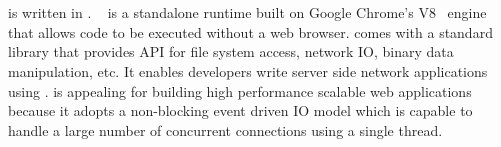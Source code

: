 








\section{\nodejs}

\cb is written in \nodejs. \nodejs~\cite{tilkov2010node} is a standalone \js
runtime
built on Google Chrome's V8~\cite{v8} \js engine that allows \js code to be executed without a web
browser.  \nodejs comes with a standard
library that provides API for file system access, network IO, binary data
manipulation, etc. It enables developers write server side network
applications using \js.
 \nodejs is appealing for building high performance
scalable web applications because it adopts a non-blocking event driven IO
model which is capable  to handle a large number of concurrent
connections using a single thread. 

